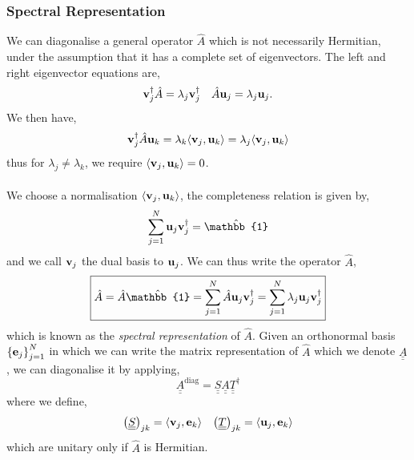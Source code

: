 \documentclass{book}
\def\innerproduct#1#2{{\langle #1},{#2 \rangle}}
\def\doubleunderline#1{\underline{\underline{#1}}}
\begin{document}
\subsubsection{Spectral Representation}
We can diagonalise a general operator $\hat{A}$ which is not necessarily Hermitian, under the assumption that it has a complete set of eigenvectors. The left and right eigenvector equations are,
\begin{align}
	\vb{v}_j^{\dag}\hat{A} = \lambda_j\vb{v}_j^{\dag} && \hat{A}\vb{u}_j = \lambda_j\vb{u}_j.
\end{align}
We then have,
\begin{equation}
	\vb{v}_j^{\dag}\hat{A}\vb{u}_k = \lambda_k\innerproduct{\vb{v}_j}{\vb{u}_k} = \lambda_j\innerproduct{\vb{v}_j}{\vb{u}_k}
\end{equation}
thus for $\lambda_j \neq \lambda_k$, we require $\innerproduct{\vb{v}_j}{\vb{u}_k} = 0$.
\\\\
We choose a normalisation $\innerproduct{\vb{v}_j}{\vb{u}_k}$, the completeness relation is given by,
\begin{equation}
	\sum_{j=1}^N \vb{u}_j\vb{v}_j^{\dag} = \hat{\mathbb{1}}
\end{equation}
and we call $\vb{v}_j$ the dual basis to $\vb{u}_j$. We can thus write the operator $\hat{A}$,
\begin{equation}
	\boxed{\hat{A} = \hat{A}\hat{\mathbb{1}} = \sum_{j=1}^N\hat{A}\vb{u}_j\vb{v}_j^{\dag} = \sum_{j=1}^N\lambda_j\vb{u}_j\vb{v}_j^{\dag}}
\end{equation}
which is known as the \textit{spectral representation} of $\hat{A}$. Given an orthonormal basis $\left\{\vb{e}_j\right\}_{j=1}^N$ in which we can write the matrix representation of $\hat{A}$ which we denote $\doubleunderline{A}$, we can diagonalise it by applying,
\begin{equation}
	\doubleunderline{A}^{\text{diag}} = \doubleunderline{S} \doubleunderline{A} \doubleunderline{T}^{\dag}
\end{equation}
where we define,
\begin{align}
	\left(\doubleunderline{S}\right)_{jk} = \innerproduct{\vb{v}_j}{ \vb{e}_k} && \left(\doubleunderline{T}\right)_{jk} = \innerproduct{\vb{u}_j}{\vb{e}_k}
\end{align}
which are unitary only if $\hat{A}$ is Hermitian.
\end{document}
